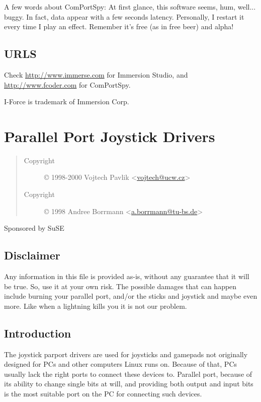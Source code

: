 \documentclass[a4paper,8pt,english]{sphinxmanual}
\begin{document}
A few words about ComPortSpy:
At first glance, this software seems, hum, well... buggy. In fact, data appear with a
few seconds latency. Personally, I restart it every time I play an effect.
Remember it's free (as in free beer) and alpha!


\subsection{URLS}
\label{input/devices/iforce-protocol:urls}
Check \href{http://www.immerse.com}{http://www.immerse.com} for Immersion Studio,
and \href{http://www.fcoder.com}{http://www.fcoder.com} for ComPortSpy.

I-Force is trademark of Immersion Corp.


\section{Parallel Port Joystick Drivers}
\label{input/devices/joystick-parport:parallel-port-joystick-drivers}\label{input/devices/joystick-parport::doc}\label{input/devices/joystick-parport:joystick-parport}\begin{quote}\begin{description}
\item[{Copyright}] \leavevmode
© 1998-2000 Vojtech Pavlik \textless{}\href{mailto:vojtech@ucw.cz}{vojtech@ucw.cz}\textgreater{}

\item[{Copyright}] \leavevmode
© 1998 Andree Borrmann \textless{}\href{mailto:a.borrmann@tu-bs.de}{a.borrmann@tu-bs.de}\textgreater{}

\end{description}\end{quote}

Sponsored by SuSE


\subsection{Disclaimer}
\label{input/devices/joystick-parport:disclaimer}
Any information in this file is provided as-is, without any guarantee that
it will be true. So, use it at your own risk. The possible damages that can
happen include burning your parallel port, and/or the sticks and joystick
and maybe even more. Like when a lightning kills you it is not our problem.


\subsection{Introduction}
\label{input/devices/joystick-parport:introduction}
The joystick parport drivers are used for joysticks and gamepads not
originally designed for PCs and other computers Linux runs on. Because of
that, PCs usually lack the right ports to connect these devices to. Parallel
port, because of its ability to change single bits at will, and providing
both output and input bits is the most suitable port on the PC for
connecting such devices.
\end{document}
